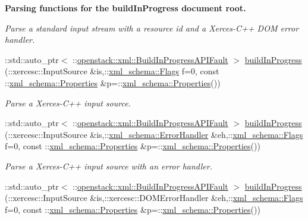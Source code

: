 \begin{Indent}{\bf Parsing functions for the buildInProgress document root.}
\begin{DoxyCompactItemize}
\begin{DoxyCompactList}\small\item\em Parse a standard input stream with a resource id and a Xerces-\/C++ DOM error handler. \item\end{DoxyCompactList}\item 
::std::auto\_\-ptr$<$ ::\hyperlink{classopenstack_1_1xml_1_1BuildInProgressAPIFault}{openstack::xml::BuildInProgressAPIFault} $>$ \hyperlink{namespaceopenstack_1_1xml_a08d50408e4e7f03234a3f324a97bd438}{buildInProgress} (::xercesc::InputSource \&is,::\hyperlink{namespacexml__schema_affb4c227cbd9aa7453dd1dc5a1401943}{xml\_\-schema::Flags} f=0, const ::\hyperlink{namespacexml__schema_ad27ce19a7ee1d3b1064092648898f64c}{xml\_\-schema::Properties} \&p=::\hyperlink{namespacexml__schema_ad27ce19a7ee1d3b1064092648898f64c}{xml\_\-schema::Properties}())
\begin{DoxyCompactList}\small\item\em Parse a Xerces-\/C++ input source. \item\end{DoxyCompactList}\item 
::std::auto\_\-ptr$<$ ::\hyperlink{classopenstack_1_1xml_1_1BuildInProgressAPIFault}{openstack::xml::BuildInProgressAPIFault} $>$ \hyperlink{namespaceopenstack_1_1xml_ab96eada2182619e272c9f8cbd54734ec}{buildInProgress} (::xercesc::InputSource \&is,::\hyperlink{namespacexml__schema_ab1c9361bfd3b404eaabf0c31eded79dc}{xml\_\-schema::ErrorHandler} \&eh,::\hyperlink{namespacexml__schema_affb4c227cbd9aa7453dd1dc5a1401943}{xml\_\-schema::Flags} f=0, const ::\hyperlink{namespacexml__schema_ad27ce19a7ee1d3b1064092648898f64c}{xml\_\-schema::Properties} \&p=::\hyperlink{namespacexml__schema_ad27ce19a7ee1d3b1064092648898f64c}{xml\_\-schema::Properties}())
\begin{DoxyCompactList}\small\item\em Parse a Xerces-\/C++ input source with an error handler. \item\end{DoxyCompactList}\item 
::std::auto\_\-ptr$<$ ::\hyperlink{classopenstack_1_1xml_1_1BuildInProgressAPIFault}{openstack::xml::BuildInProgressAPIFault} $>$ \hyperlink{namespaceopenstack_1_1xml_ac9c0b8f93644abe3fd6016358d218dcf}{buildInProgress} (::xercesc::InputSource \&is,::xercesc::DOMErrorHandler \&eh,::\hyperlink{namespacexml__schema_affb4c227cbd9aa7453dd1dc5a1401943}{xml\_\-schema::Flags} f=0, const ::\hyperlink{namespacexml__schema_ad27ce19a7ee1d3b1064092648898f64c}{xml\_\-schema::Properties} \&p=::\hyperlink{namespacexml__schema_ad27ce19a7ee1d3b1064092648898f64c}{xml\_\-schema::Properties}())

\end{DoxyCompactItemize}
\end{Indent}

